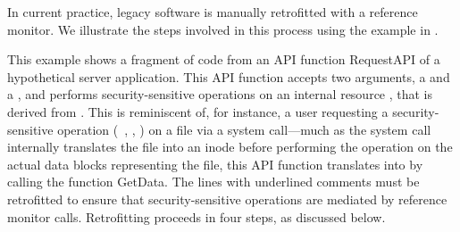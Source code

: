 In current practice, legacy software is manually retrofitted with a reference
monitor. We illustrate the steps involved in this process using the example in
. 

This example shows a fragment of code from an API function \textsf{RequestAPI}
of a hypothetical server application. This API function accepts two arguments,
a  and a , and performs security-sensitive operations
on an internal resource , that is derived from . This is
reminiscent of, for instance, a user requesting a security-sensitive operation
(\eg~, , ) on a file via a system call---much as
the system call internally translates the file into an inode before performing
the operation on the actual data blocks representing the file, this API
function translates  into  by calling the function
\textsf{GetData}. The lines with underlined comments must be retrofitted to
ensure that security-sensitive operations are mediated by reference monitor
calls.  Retrofitting proceeds in four steps, as discussed below.


